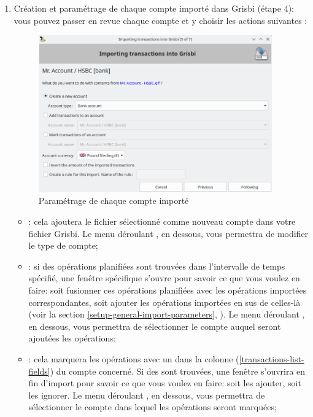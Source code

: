 \begin{enumerate}
	\item Création et paramétrage de chaque compte importé dans Grisbi (étape 4): vous pouvez passer en revue chaque compte et y choisir les actions suivantes	:
	\begin{figure}[htbp]
		\begin{center}
		\includegraphics[width=0.95\textwidth]{image/screenshot/importexport_import_files_setup}
		\end{center}
		\caption{Paramétrage de chaque compte importé}
		\label{importexport-import-files-setup-img}
	\end{figure}
		\begin{itemize}
			\item {}: cela ajoutera le fichier sélectionné comme nouveau compte dans votre fichier Grisbi. Le menu déroulant , en dessous, vous permettra de modifier le type de compte;
			\item {}: si des opérations planifiées sont trouvées dans l'intervalle de temps spécifié, une fenêtre spécifique s'ouvre pour savoir ce que vous voulez en faire: soit fusionner ces opérations planifiées avec les opérations importées correspondantes, soit ajouter les opérations importées en sus de celles-là (voir la section \vref{setup-general-import-parameters}, ). Le menu déroulant , en dessous, vous permettra de sélectionner le compte auquel seront ajoutées les opérations;
			\item {}: cela marquera les opérations avec un  dans la colonne  (\vref{transactions-list-fields}) du compte concerné. Si des  sont trouvées, une fenêtre s'ouvrira en fin d'import pour savoir ce que vous voulez en faire: soit les ajouter, soit les ignorer. Le menu déroulant , en dessous, vous permettra de sélectionner le compte dans lequel les opérations seront marquées;

\end{itemize}
\end{enumerate}
